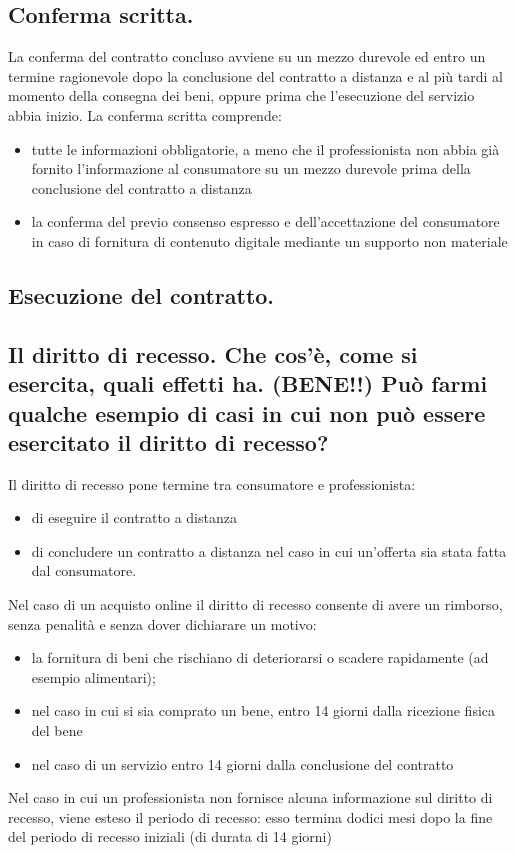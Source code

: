 \subsection{Conferma scritta.}
La conferma del contratto concluso avviene su un mezzo durevole ed entro un termine
ragionevole dopo la conclusione del contratto a distanza e al più tardi al momento della
consegna dei beni, oppure prima che l'esecuzione del servizio abbia inizio.
\newline
La conferma scritta comprende:
\begin{itemize}
    \item tutte le informazioni obbligatorie, a meno che il professionista non abbia già
        fornito l'informazione al consumatore su un mezzo durevole prima della conclusione
        del contratto a distanza
    \item la conferma del previo consenso espresso e dell'accettazione del consumatore in
        caso di fornitura di contenuto digitale mediante un supporto non materiale
\end{itemize}

\subsection{Esecuzione del contratto.}
\subsection{Il diritto di recesso. Che cos’è, come si esercita, quali effetti ha. (BENE!!)
Può farmi qualche esempio di casi in cui non può essere esercitato il diritto di recesso?}

Il diritto di recesso pone termine tra consumatore e professionista:
\begin{itemize}
    \item di eseguire il contratto a distanza
    \item di concludere un contratto a distanza nel caso in cui un'offerta sia stata fatta dal consumatore.
\end{itemize}
Nel caso di un acquisto online il diritto di recesso consente di avere un rimborso, senza
penalità e senza dover dichiarare un motivo:
\begin{itemize}
    \item la fornitura di beni che rischiano di deteriorarsi o scadere rapidamente (ad esempio alimentari);
    \item nel caso in cui si sia comprato un bene, entro 14 giorni dalla ricezione fisica del bene
    \item nel caso di un servizio entro 14 giorni dalla conclusione del contratto
\end{itemize}
Nel caso in cui un professionista non fornisce alcuna informazione sul diritto di recesso,
viene esteso il periodo di recesso: esso termina dodici mesi dopo la fine del periodo di
recesso iniziali (di durata di 14 giorni)

